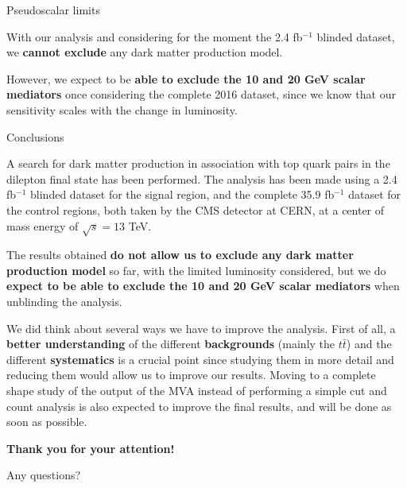 \documentclass[8 pt]{beamer}
\begin{document}
\begin{frame}{Pseudoscalar limits}
   \vspace{-10pt}
   \begin{block}{}
   \justifying
   \vspace{5pt}
	With our analysis and considering for the moment the 2.4 fb$^{-1}$ blinded dataset, we \textbf{cannot exclude} any dark matter production model. \vspace{5pt}
	\end{block} \vfill
	
	\justifying
	However, we expect to be \textbf{able to exclude the 10 and 20 GeV scalar mediators} once considering the complete 2016 dataset, since we know that our sensitivity scales with the change in luminosity. \vfill
   

\end{frame}


\begin{frame}{Conclusions}

	\justifying
	A search for dark matter production in association with top quark pairs in the dilepton final state has been performed. The analysis has been made using a 2.4 fb$^{-1}$ blinded dataset for the signal region, and the complete 35.9 fb$^{-1}$ dataset for the control regions, both taken by the CMS detector at CERN, at a center of mass energy of $\sqrt{s} = 13$ TeV. \vfill
	
	The results obtained \textbf{do not allow us to exclude any dark matter production model} so far, with the limited luminosity considered, but we do \textbf{expect to be able to exclude the 10 and 20 GeV scalar mediators} when unblinding the analysis. \vfill
	
	We did think about several ways we have to improve the analysis. First of all, a \textbf{better understanding} of the different \textbf{backgrounds} (mainly the $t \bar t$) and the different \textbf{systematics} is a crucial point since studying them in more detail and reducing them would allow us to improve our results. Moving to a complete shape study of the output of the MVA instead of performing a simple cut and count analysis is also expected to improve the final results, and will be done as soon as possible. \vfill

\end{frame}



\begin{frame}{}

	\centering
	\huge{\textbf{\color{mycolor} Thank you  \color{black}}} \newline
	\LARGE{\textbf{\color{mycolor} for your attention! \color{black}}} \vfill

	Any questions? \vfill

\end{frame}
\end{document}
